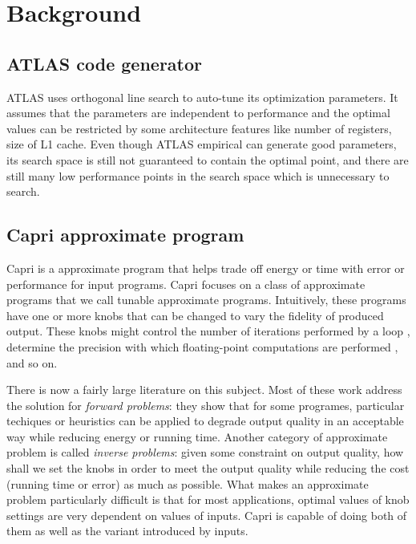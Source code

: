 \section{Background}
\label{sec:background}

  \subsection{ATLAS code generator}
  \label{sec:atlas_intro}
  ATLAS uses orthogonal line search to auto-tune its optimization parameters.
  It assumes that the parameters are independent to performance and the optimal values can be
  restricted by some architecture features like number of registers, size of L1 cache.
  Even though ATLAS empirical can generate good parameters, its search space is still not guaranteed to contain
  the optimal point, and there are still many low performance points in the search space which is unnecessary
  to search.

  \subsection{Capri approximate program}
  \label{sec:Capri_intro}
  Capri is a approximate program that helps trade off energy or time with error
  or performance for input programs. Capri focuses on a class of approximate
  programs that we call tunable approximate programs. Intuitively, these
  programs have one or more knobs that can be changed to vary the fidelity of
  produced output. These knobs might control the number of iterations performed
  by a loop \cite{}, determine the precision with which floating-point
  computations are performed \cite{}, and so on.

  There is now a fairly large literature on this subject. Most of these work
  address the solution for \emph{forward problems}: they show that for some
  programes, particular techiques or heuristics can be applied to degrade
  output quality in an acceptable way while reducing energy or running time.
  Another category of approximate problem is called \emph{
  inverse problems}: given some constraint on output quality, how shall we set
  the knobs in order to meet the output quality while reducing the cost (running
  time or error) as much as possible. What makes an approximate problem
  particularly difficult is that for most applications, optimal values of
  knob settings are very dependent on values of inputs. Capri is capable of
  doing both of them as well as the variant introduced by inputs.

